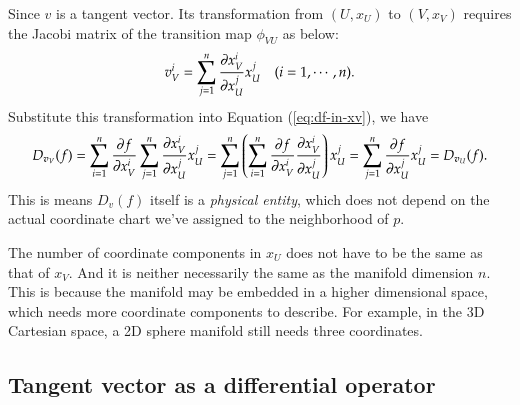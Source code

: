 \documentclass[11pt, a4paper]{book}
\begin{document}
\begin{Proof}
  Since $v$ is a tangent vector. Its transformation from $(U,x_U)$ to $(V,x_V)$ requires
  the Jacobi matrix of the transition map $\phi_{VU}$ as below:
  \begin{equation}
    \label{eq:tangent-vector-transform}
    v_V^i = \sum_{j=1}^n \frac{\partial x_{V}^i}{\partial x_{U}^j} x_U^j \quad (i=1,\cdots,n).
  \end{equation}
  Substitute this transformation into Equation (\ref{eq:df-in-xv}), we have
  $$
  D_{\boldsymbol{v}_V}(f) = \sum_{i=1}^n \frac{\partial f}{\partial x_V^i} \sum_{j=1}^n \frac{\partial
    x_{V}^i}{\partial x_{U}^j} x_U^j = \sum_{j=1}^n \left( \sum_{i=1}^n \frac{\partial f}{\partial
      x_V^i} \frac{\partial x_{V}^i}{\partial x_{U}^j} \right) x_U^j = \sum_{j=1}^n \frac{\partial
    f}{\partial x_U^j} x_U^j = D_{\boldsymbol{v}_U}(f).
  $$
  This is means $D_v(f)$ itself is a \emph{physical entity}, which does not depend on the
  actual coordinate chart we've assigned to the neighborhood of $p$.
\end{Proof}

\begin{Remark}
  The number of coordinate components in $x_U$ does not have to be the same as that of
  $x_V$. And it is neither necessarily the same as the manifold dimension $n$. This is
  because the manifold may be embedded in a higher dimensional space, which needs more
  coordinate components to describe. For example, in the 3D Cartesian space, a 2D sphere
  manifold still needs three coordinates.
\end{Remark}

\subsection{Tangent vector as a differential operator}
\end{document}
